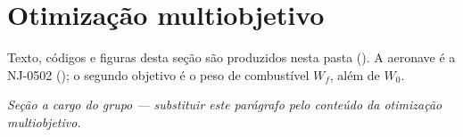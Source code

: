 
\section{Otimização multiobjetivo}
\label{sec:multiobjetivo}

Texto, códigos e figuras desta seção são produzidos nesta pasta
(). A aeronave é a
NJ-0502 (); o segundo objetivo é o peso de combustível
$W_f$, além de $W_0$.

\textit{Seção a cargo do grupo --- substituir este parágrafo pelo
conteúdo da otimização multiobjetivo.}
